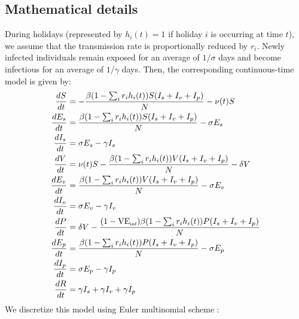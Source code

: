 \documentclass[12pt]{article}
\begin{document}
\subsection*{Mathematical details}

During holidays (represented by $h_i(t) = 1$ if holiday $i$ is occurring at time $t$), we assume that the transmission rate is proportionally reduced by $r_i$. 
Newly infected individuals remain exposed for an average of $1/\sigma$ days and become infectious for an average of $1/\gamma$ days.
Then, the corresponding continuous-time model is given by:
  \begin{align}
  \frac{dS}{dt} &= - \frac{\beta (1 - \sum_i r_i h_i(t)) S (I_s + I_v + I_p)}{N} - \nu(t) S\\
  \frac{dE_s}{dt} &= \frac{\beta (1 - \sum_i r_i h_i(t)) S (I_s + I_v + I_p)}{N} - \sigma E_s\\
  \frac{dI_s}{dt} &= \sigma E_s - \gamma I_s\\
  \frac{dV}{dt} &= \nu(t) S - \frac{\beta (1 - \sum_i r_i h_i(t)) V (I_s + I_v + I_p)}{N} - \delta V\\
  \frac{dE_v}{dt} &= \frac{\beta (1 - \sum_i r_i h_i(t)) V (I_s + I_v + I_p)}{N} - \sigma E_v\\
  \frac{dI_v}{dt} &= \sigma E_v - \gamma I_v\\
  \frac{dP}{dt} &= \delta V - \frac{(1-\mathrm{VE}_{\textrm{\tiny{inf}}})\beta (1 - \sum_i r_i h_i(t)) P (I_s + I_v + I_p)}{N}\\
  \frac{dE_p}{dt} &= \frac{\beta (1 - \sum_i r_i h_i(t)) P (I_s + I_v + I_p)}{N} - \sigma E_p\\
  \frac{dI_p}{dt} &= \sigma E_p - \gamma I_p\\
  \frac{dR}{dt} &= \gamma I_s + \gamma I_v + \gamma I_p\\
  \end{align}
We discretize this model using Euler multinomial scheme \citep{he2010plug}:
\end{document}
